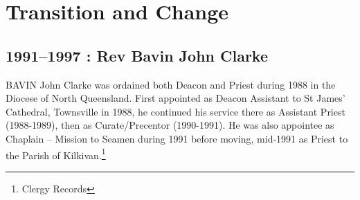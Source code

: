 \printendnotes[custom]
\setcounter{endnote}{0}
\chapter{Transition and Change}
\nobalance


\section{1991--1997 : Rev Bavin John Clarke}



\lettrine[lines=3]{B}{AVIN}
 John Clarke was ordained both Deacon and Priest during 1988 in the Diocese of North Queensland. First appointed as Deacon Assistant to St James' Cathedral, Townsville in 1988, he continued his service there as Assistant Priest (1988-1989), then as Curate/Precentor (1990-1991). He was also appointee as Chaplain -- Mission to Seamen during 1991 before moving, mid-1991 as Priest to the Parish of Kilkivan.\footnote{Clergy Records}







